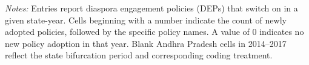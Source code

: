 \begin{table}[htbp]
\vspace{0.4em}
\begin{minipage}{0.97\textwidth}
\scriptsize
\textit{Notes:} Entries report diaspora engagement policies (DEPs) that switch on in a given state-year. Cells beginning with a number indicate the count of newly adopted policies, followed by the specific policy names. A value of 0 indicates no new policy adoption in that year. Blank Andhra Pradesh cells in 2014--2017 reflect the state bifurcation period and corresponding coding treatment.
\end{minipage}
\end{table}

